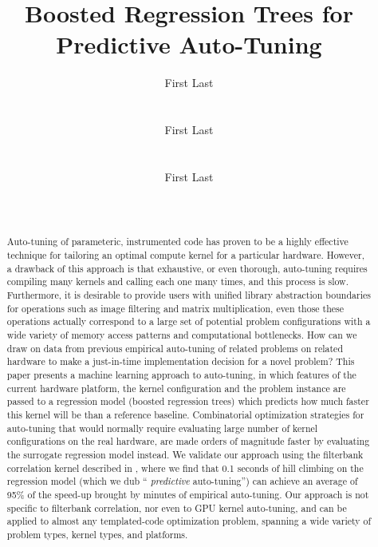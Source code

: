 \documentclass{sig-alternate}
\title{Boosted Regression Trees for Predictive Auto-Tuning}
\author{
\alignauthor First Last\\
\affaddr{Affiliation line 1}\\
\affaddr{Affiliation line 2}\\
\email{anon@mail.com}
\alignauthor First Last\\
\affaddr{Affiliation line 1}\\
\affaddr{Affiliation line 2}\\
\email{anon@mail.com}
\alignauthor First Last\\
\affaddr{Affiliation line 1}\\
\affaddr{Affiliation line 2}\\
\email{anon@mail.com}
}
\begin{document}
\maketitle

\begin{abstract}

Auto-tuning of parameteric, instrumented code has proven to be a highly
effective technique for tailoring an optimal compute kernel for a particular
hardware.
However, a drawback of this approach is that exhaustive, or even thorough,
auto-tuning requires compiling many kernels and calling each one many times,
and this process is slow.  Furthermore, it is desirable to provide users
with unified library abstraction boundaries for operations such as image
filtering and matrix multiplication, even those these operations actually
correspond to a large set of potential problem configurations with a wide
variety of memory access patterns and computational bottlenecks.  How can we
draw on data from previous empirical auto-tuning of related problems on related
hardware to make a just-in-time implementation decision for a novel problem?
This paper presents a machine learning approach to auto-tuning, in which
features of the current hardware platform, the kernel configuration and the
problem instance are passed to a regression model (boosted regression trees)
which predicts how much faster this kernel will be than a reference
baseline.  Combinatorial optimization strategies for auto-tuning that would
normally require evaluating large number of kernel configurations on the real
hardware, are made orders of magnitude faster by evaluating the surrogate
regression model instead.  We validate our approach using the filterbank
correlation kernel described in \citet{pinto+cox:2011gcg}, where we find that
0.1 seconds of hill climbing on the regression model (which we dub ``{\em
predictive} auto-tuning'') can achieve an average of 95\% of the
speed-up brought by minutes of empirical auto-tuning.  Our approach is not
specific to filterbank correlation, nor even to GPU kernel auto-tuning, and can
be applied to almost any templated-code optimization problem, spanning a wide
variety of problem types, kernel types, and platforms.

\end{abstract}


\end{document}
